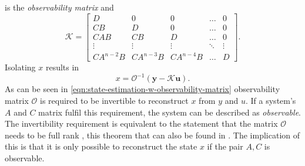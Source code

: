is the \textit{observability matrix} and
\[ \mathcal{K}=
\begin{bmatrix}
    D & 0 & 0 & \hdots & 0\\
    CB & D & 0 & \hdots & 0\\
    CAB & CB & D & \hdots & 0 \\
    \vdots & \vdots & \vdots & \ddots & \vdots \\
    CA^{n-2}B & CA^{n-3}B & CA^{n-4}B & \hdots & D
\end{bmatrix}.
\]
Isolating $x$ results in
\begin{equation}\label{eqn:state-estimation-w-observability-matrix}
    x = \mathcal{O}^{-1}(\mathbf{y}-\mathcal{K}\mathbf{u}).
\end{equation}
As can be seen in \eqref{eqn:state-estimation-w-observability-matrix} observability matrix $\mathcal{O}$ is required to be invertible to reconstruct $x$ from $y$ and $u$. If a system's $A$ and $C$ matrix fulfil this requirement, the system can be described as \textit{observable}. The invertibility requirement is equivalent to the statement that the matrix $\mathcal{O}$ needs to be full rank \cite[Section 2.9]{Lay2016LinearApplications}, this theorem that can also be found in \cite[Corollary 3.8]{Antsaklis2006LinearProcessing}. The implication of this is that it is only possible to reconstruct the state $x$ if the pair $A,C$ is observable. \\

